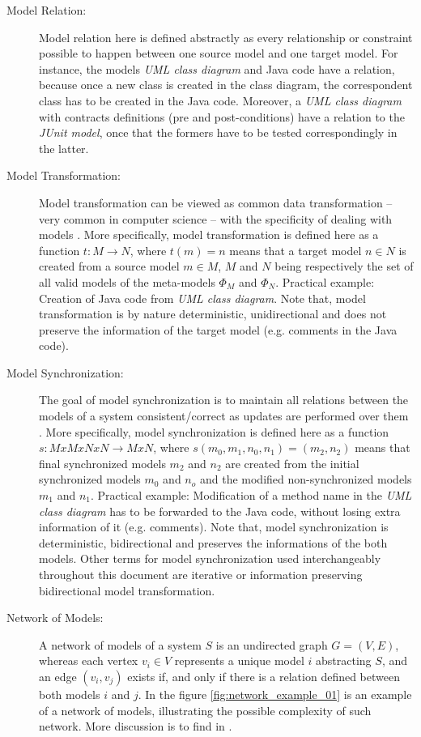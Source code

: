 \documentclass[tuberlin,cic,tc,english,noabntcite]{iiufrgs}
\begin{document}
\begin{description}
	\item[Model Relation:] Model relation here is defined abstractly as every relationship or constraint possible to happen between one source model and one target model. For instance, the models \emph{UML class diagram} and Java code have a relation, because once a new class is created in the class diagram, the correspondent class has to be created in the Java code. Moreover, a \emph{UML class diagram} with contracts definitions (pre and post-conditions) have a relation to the \emph{JUnit model}, once that the formers have to be tested correspondingly in the latter.

	\item[Model Transformation:] Model transformation can be viewed as common data transformation – very common in computer science – with the specificity of dealing with models \cite{czarnecki2006feature}. More specifically, model transformation is defined here as a function $t : M \rightarrow N$, where $t(m) = n$ means that a target model $n \in N$ is created from a source model $m \in M$, $M$ and $N$ being respectively the set of all valid models of the meta-models $\Phi_M$ and $\Phi_N$. Practical example: Creation of Java code from \emph{UML class diagram}. Note that, model transformation is by nature deterministic, unidirectional and does not preserve the information of the target model (e.g. comments in the Java code).

	\item[Model Synchronization:] The goal of model synchronization is to maintain all relations between the models of a system consistent/correct as updates are performed over them \cite{diskin2011model}. More specifically, model synchronization is defined here as a function $s : M x M x N x N \rightarrow M x N $, where $s(m_0,m_1,n_0,n_1) = (m_2,n_2)$ means that final synchronized models $m_2$ and $n_2$ are created from the initial synchronized models $m_0$ and $n_o$ and the modified non-synchronized models $m_1$ and $n_1$. Practical example: Modification of a method name in the \emph{UML class diagram} has to be forwarded to the Java code, without losing extra information of it (e.g. comments). Note that, model synchronization is deterministic, bidirectional and preserves the informations of the both models. Other terms for model synchronization used interchangeably throughout this document are iterative or information preserving bidirectional model transformation.

	\item[Network of Models:] A network of models of a system $S$ is an undirected graph $G = (V,E)$, whereas each vertex $v_i \in V$ represents a unique model $i$ abstracting $S$, and an edge $(v_i, v_j)$ exists if, and only if there is a relation defined between both models $i$ and $j$. In the figure \ref{fig:network_example_01} is an example of a network of models, illustrating the possible complexity of such network. More discussion is to find in \citet{mens2006taxonomy}.


\end{description}
\end{document}
